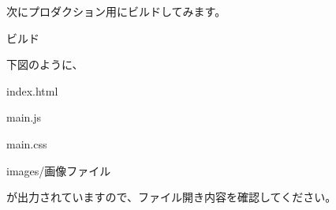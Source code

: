 \begin{reviewimage}%
%
\label{image:02-create-react-app:webpack_test04}
\end{reviewimage}

\clearpage


次にプロダクション用にビルドしてみます。

\def\startercodeblockfontsize{}
\begin{starterterminal}[]{ビルド}\end{starterterminal}

下図のように、\\[0pt]

\begin{starteritemize}
\item index.html
\item main.js
\item main.css
\item images/画像ファイル
\end{starteritemize}

が出力されていますので、ファイル開き内容を確認してください。


